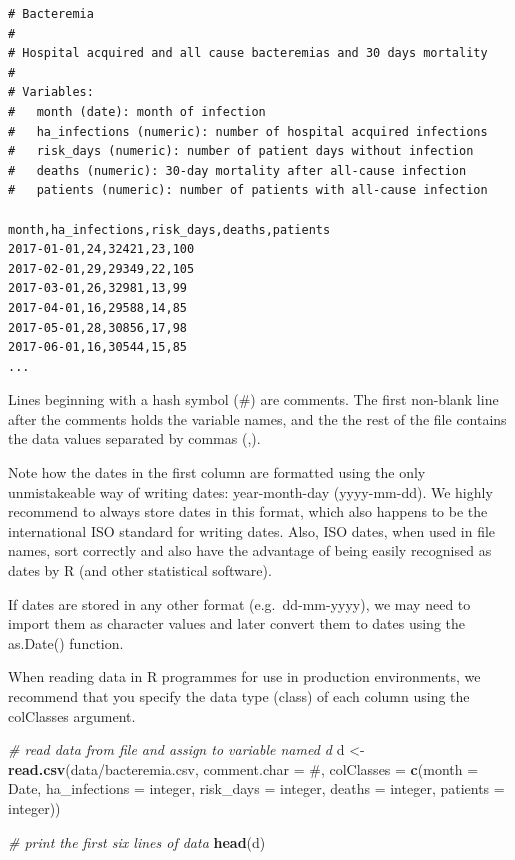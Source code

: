 \documentclass[
]{book}
\newenvironment{Shaded}{\begin{snugshade}}{\end{snugshade}}
\newcommand{\AttributeTok}[1]{\textcolor[rgb]{0.13,0.29,0.53}{#1}}
\newcommand{\CommentTok}[1]{\textcolor[rgb]{0.56,0.35,0.01}{\textit{#1}}}
\newcommand{\FunctionTok}[1]{\textcolor[rgb]{0.13,0.29,0.53}{\textbf{#1}}}
\newcommand{\NormalTok}[1]{#1}
\newcommand{\OtherTok}[1]{\textcolor[rgb]{0.56,0.35,0.01}{#1}}
\newcommand{\StringTok}[1]{\textcolor[rgb]{0.31,0.60,0.02}{#1}}
\begin{document}
\begin{verbatim}
# Bacteremia
# 
# Hospital acquired and all cause bacteremias and 30 days mortality
# 
# Variables:
#   month (date): month of infection
#   ha_infections (numeric): number of hospital acquired infections
#   risk_days (numeric): number of patient days without infection
#   deaths (numeric): 30-day mortality after all-cause infection
#   patients (numeric): number of patients with all-cause infection

month,ha_infections,risk_days,deaths,patients
2017-01-01,24,32421,23,100
2017-02-01,29,29349,22,105
2017-03-01,26,32981,13,99
2017-04-01,16,29588,14,85
2017-05-01,28,30856,17,98
2017-06-01,16,30544,15,85
...
\end{verbatim}

Lines beginning with a hash symbol (\#) are comments. The first
non-blank line after the comments holds the variable names, and the the
rest of the file contains the data values separated by commas (,).

Note how the dates in the first column are formatted using the only
unmistakeable way of writing dates: year-month-day (yyyy-mm-dd). We
highly recommend to always store dates in this format, which also
happens to be the international ISO standard for writing dates. Also,
ISO dates, when used in file names, sort correctly and also have the
advantage of being easily recognised as dates by R (and other
statistical software).

If dates are stored in any other format (e.g.~dd-mm-yyyy), we may need
to import them as character values and later convert them to dates using
the as.Date() function.

When reading data in R programmes for use in production environments, we
recommend that you specify the data type (class) of each column using
the colClasses argument.

\begin{Shaded}
\begin{Highlighting}[]
\CommentTok{\# read data from file and assign to variable named d}
\NormalTok{d }\OtherTok{\textless{}{-}} \FunctionTok{read.csv}\NormalTok{(}\StringTok{\textquotesingle{}data/bacteremia.csv\textquotesingle{}}\NormalTok{,}
              \AttributeTok{comment.char =} \StringTok{\textquotesingle{}\#\textquotesingle{}}\NormalTok{,}
              \AttributeTok{colClasses   =} \FunctionTok{c}\NormalTok{(}\AttributeTok{month         =} \StringTok{\textquotesingle{}Date\textquotesingle{}}\NormalTok{,}
                               \AttributeTok{ha\_infections =} \StringTok{\textquotesingle{}integer\textquotesingle{}}\NormalTok{,}
                               \AttributeTok{risk\_days     =} \StringTok{\textquotesingle{}integer\textquotesingle{}}\NormalTok{,}
                               \AttributeTok{deaths        =} \StringTok{\textquotesingle{}integer\textquotesingle{}}\NormalTok{,}
                               \AttributeTok{patients      =} \StringTok{\textquotesingle{}integer\textquotesingle{}}\NormalTok{))}

\CommentTok{\# print the first six lines of data}
\FunctionTok{head}\NormalTok{(d)}
\end{Highlighting}
\end{Shaded}
\end{document}
